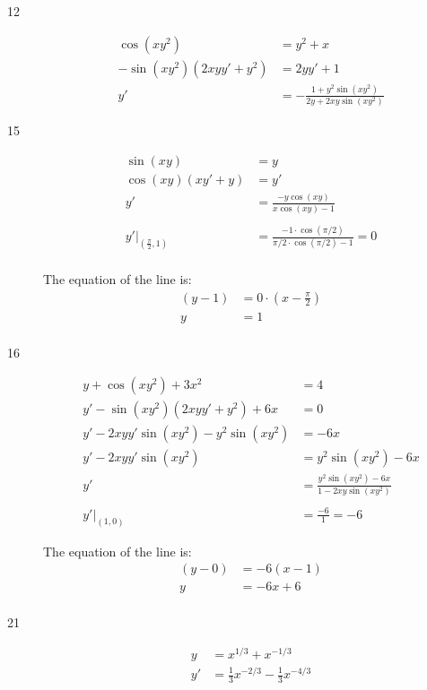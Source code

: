 \documentclass{exam}
\begin{document}
\begin{description}
\item[12]
\begin{align*}
  \cos(xy^2) &= y^2 + x \\
  -\sin(xy^2)(2xyy' + y^2) &= 2yy' + 1 \\
  y' &= - \frac{1 + y^2 \sin(xy^2)}{2y + 2xy \sin(xy^2)}
\end{align*}

\item[15]
\begin{align*}
  \sin(xy) &= y \\
  \cos(xy)(xy' + y) &= y' \\
  y' &= \frac{-y \cos(xy)}{x \cos(xy) - 1} \\
  \\
  y' |_{\left(\frac{\pi}{2}, 1 \right)} &= \frac{-1 \cdot \cos(\pi/2)}{\pi/2 \cdot \cos(\pi/2) - 1} = 0 \\
\end{align*}

The equation of the line is:
\begin{align*}
  (y - 1) &= 0 \cdot \left(x - \frac{\pi}{2} \right) \\
  y &= 1 \\
\end{align*}

\item[16]

\begin{align*}
  y + \cos(xy^2) + 3x^2 &= 4 \\
  y' - \sin(xy^2)(2xyy' + y^2) + 6x &= 0 \\
  y' - 2xyy' \sin(xy^2) - y^2 \sin(xy^2) &= -6x \\
  y' - 2xyy' \sin(xy^2)  &= y^2 \sin(xy^2) -6x \\
  y' &= \frac{y^2 \sin(xy^2) -6x}{1 - 2xy \sin(xy^2)} \\
  \\
  y'|_{(1, 0)} &= \frac{-6}{1} = -6
\end{align*}

The equation of the line is:
\begin{align*}
  (y - 0) &= -6 (x - 1) \\
  y &= -6x + 6 \\
\end{align*}

\item[21]
\begin{align*}
  y &= x^{1/3} + x^{-1/3} \\
  y' &= \frac{1}{3}x^{-2/3} - \frac{1}{3} x^{-4/3} \\
\end{align*}


\end{description}
\end{document}
